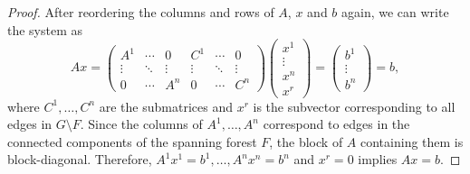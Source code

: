 \documentclass[10pt,a4paper]{amsart}
\begin{document}
\begin{proof}
After reordering the columns and rows of $A$, $x$ and $b$ again, we can write the system as
\begin{equation*}
Ax=
\begin{pmatrix}
A^1 & \cdots & 0 & C^1 & \cdots & 0 \\
\vdots & \ddots & \vdots & \vdots & \ddots & \vdots \\
0 & \cdots & A^n & 0 & \cdots & C^n
\end{pmatrix}
\begin{pmatrix}
x^1 \\
\vdots \\
x^n \\
x^r
\end{pmatrix}=
\begin{pmatrix}
b^1 \\
\vdots \\
b^n 
\end{pmatrix}=b ,
\end{equation*}
where $C^1,\ldots, C^n$ are the submatrices and $x^r$ is the subvector corresponding to all edges in $G\setminus F$. Since the columns of $A^1,\ldots,A^n$ correspond to edges in the connected components of the spanning forest $F$, the block of $A$ containing them is block-diagonal. Therefore, $A^1x^1=b^1,\ldots, A^nx^n=b^n$ and $x^r=0$ implies $Ax=b$.  
\end{proof}
\end{document}
